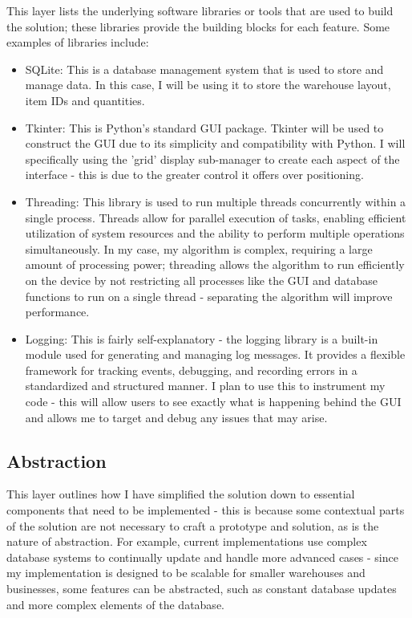 This layer lists the underlying software libraries or tools that are used to build the solution; these libraries provide the building blocks for each feature. Some examples of libraries include:
\begin{itemize}
    \item SQLite: This is a database management system that is used to store and manage data. In this case, I will be using it to store the warehouse layout, item IDs and quantities.
    \item Tkinter: This is Python's standard GUI package. Tkinter will be used to construct the GUI due to its simplicity and compatibility with Python. I will specifically using the 'grid' display sub-manager to create each aspect of the interface - this is due to the greater control it offers over positioning.
    \item Threading: This library is used to run multiple threads concurrently within a single process. Threads allow for parallel execution of tasks, enabling efficient utilization of system resources and the ability to perform multiple operations simultaneously. In my case, my algorithm is complex, requiring a large amount of processing power; threading allows the algorithm to run efficiently on the device by not restricting all processes like the GUI and database functions to run on a single thread - separating the algorithm will improve performance.
    \item Logging: This is fairly self-explanatory - the logging library is a built-in module used for generating and managing log messages. It provides a flexible framework for tracking events, debugging, and recording errors in a standardized and structured manner. I plan to use this to instrument my code - this will allow users to see exactly what is happening behind the GUI and allows me to target and debug any issues that may arise.

\end{itemize}

\subsection{Abstraction}

This layer outlines how I have simplified the solution down to essential components that need to be implemented - this is because some contextual parts of the solution are not necessary to craft a prototype and solution, as is the nature of abstraction. For example, current implementations use complex database systems to continually update and handle more advanced cases - since my implementation is designed to be scalable for smaller warehouses and businesses, some features can be abstracted, such as constant database updates and more complex elements of the database.


